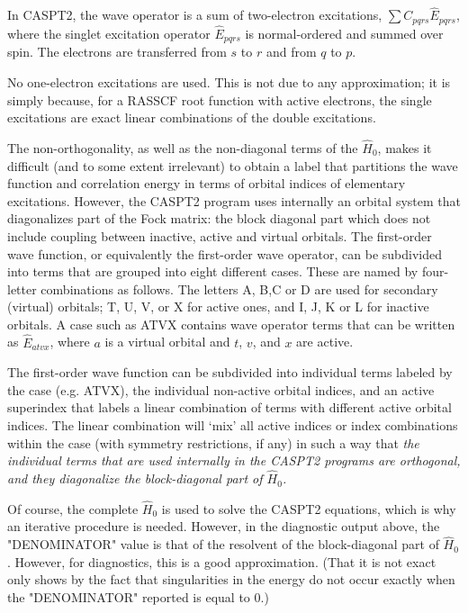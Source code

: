 In CASPT2, the wave operator is a sum of two-electron excitations,
$\sum C_{pqrs}\hat{E}_{pqrs}$, where the singlet excitation operator 
$\hat{E}_{pqrs}$ is normal-ordered and summed over spin. The electrons
are transferred from  $s$ to $r$ and from $q$ to $p$.


No one-electron excitations are used. This is not due to any approximation;
it is simply because, for a RASSCF root function with active electrons, the 
single excitations are exact linear combinations of the double excitations.

The non-orthogonality, as well as the non-diagonal terms of the $\hat{H}_0$, makes it
difficult (and to some extent irrelevant) to obtain a label that partitions the
wave function and correlation energy in terms of orbital indices of elementary
excitations. However, the CASPT2 program uses internally an orbital system that
diagonalizes part of the Fock matrix: the block diagonal part which does not
include coupling between inactive, active and virtual orbitals. The first-order
wave function, or equivalently the first-order wave operator, can be
subdivided into terms that are grouped into eight different cases. These are named
by four-letter combinations as follows. The letters A, B,C or D are used for
secondary (virtual) orbitals; T, U, V, or X for active ones, and I, J, K or L
for inactive orbitals. A case such as ATVX contains wave operator terms that
can be written as $\hat{E}_{atvx}$, where $a$ is a virtual orbital and $t$, $v$,
and $x$ are active. 

The first-order wave function can be subdivided into individual terms labeled
by the case (e.g. ATVX), the individual non-active orbital indices, and an
active superindex that labels a linear combination of terms with different
active orbital indices. The linear combination will `mix' all active indices or
index combinations within the case (with symmetry restrictions, if any) in such
a way that {\em the individual terms that are used internally in the CASPT2
programs are orthogonal, and they diagonalize the block-diagonal part of $\hat{H}_0$.}


Of course, the complete $\hat{H}_0$ is used to solve the CASPT2 equations, which
is why an iterative procedure is needed. However, in the diagnostic output above,
the "DENOMINATOR" value is that of the resolvent of the block-diagonal part of
$\hat{H}_0$. However, for diagnostics, this is a good approximation. (That it is
not exact only shows by the fact that singularities in the energy do not
occur exactly when the "DENOMINATOR" reported is equal to 0.)

